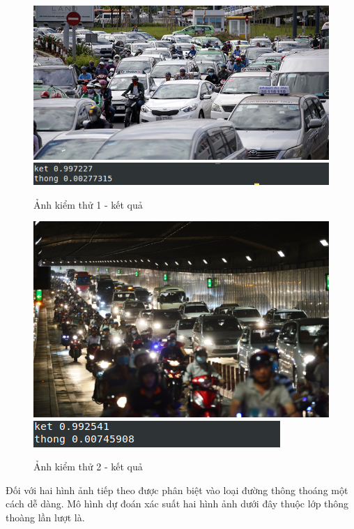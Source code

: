 	\begin{figure}[h!]
		\centering
		\includegraphics[scale=0.5]{charts/test.jpg}
		\includegraphics[scale=0.5]{charts/res_test.png}
		\caption{Ảnh kiểm thử 1 - kết quả}
		\label{fig:test1}
	\end{figure}
	
	\begin{figure}[h!]
		\centering
		\includegraphics[scale=0.2]{charts/test2.JPG}
		\includegraphics[scale=0.5]{charts/res_test2.png}
		\caption{Ảnh kiểm thử 2 - kết quả}
		\label{fig:test2}
	\end{figure}
	\pagebreak
	
	Đối với hai hình ảnh tiếp theo được phân biệt vào loại đường thông thoáng một cách dễ dàng. Mô hình dự đoán xác suất hai hình ảnh dưới đây thuộc lớp thông thoàng lần lượt là.
	
